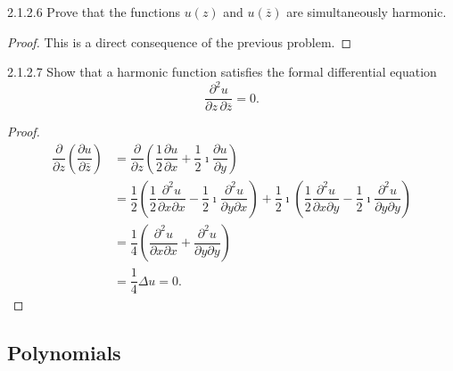 \begin{problem}{2.1.2.6}
Prove that the functions \( u(z) \) and \( u(\overline{z}) \) are simultaneously harmonic.
\end{problem}

\begin{proof}
	This is a direct consequence of the previous problem.
\end{proof}

\begin{problem}{2.1.2.7}
Show that a harmonic function satisfies the formal differential equation
\[
	\frac{\partial^{2} u}{\partial z \, \partial \overline{z}} = 0.
\]
\end{problem}

\begin{proof}
	\begingroup
	\allowdisplaybreaks%
	\begin{align*}
		\dfrac{\partial}{\partial z}\left( \dfrac{\partial u}{\partial \bar{z}} \right) & = \dfrac{\partial}{\partial z}\left( \dfrac{1}{2}\dfrac{\partial u}{\partial x} + \dfrac{1}{2}\imath\dfrac{\partial u}{\partial y} \right)                                                                                                                                                                          \\
		                                                                                & = \dfrac{1}{2}\left( \dfrac{1}{2}\dfrac{\partial^{2} u}{\partial x\partial x} - \dfrac{1}{2}\imath \dfrac{\partial^{2}u}{\partial y\partial x} \right) + \dfrac{1}{2}\imath \left( \dfrac{1}{2}\dfrac{\partial^{2} u}{\partial x\partial y} - \dfrac{1}{2}\imath\dfrac{\partial^{2}u}{\partial y\partial y} \right) \\
		                                                                                & = \dfrac{1}{4}\left( \dfrac{\partial^{2} u}{\partial x\partial x} + \dfrac{\partial^{2}u}{\partial y\partial y}\right)                                                                                                                                                                                              \\
		                                                                                & = \dfrac{1}{4}\Delta u = 0.
	\end{align*}
	\endgroup
\end{proof}

\subsection{Polynomials}


